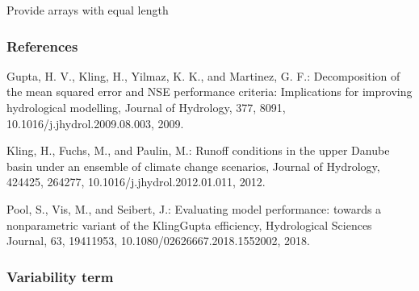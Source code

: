 \documentclass[letterpaper,10pt,english]{sphinxmanual}
\begin{document}
\begin{fulllineitems}
Provide arrays with equal length

\begin{sphinxVerbatim}[commandchars=\\\{\}]
   
   
  \PYG{p}{[}     \PYG{p}{]}
  \PYG{p}{[}     \PYG{p}{]}
 
\end{sphinxVerbatim}
\subsubsection*{References}

Gupta, H. V., Kling, H., Yilmaz, K. K., and Martinez, G. F.: Decomposition
of the mean squared error and NSE performance criteria: Implications for
improving hydrological modelling, Journal of Hydrology, 377, 80\sphinxhyphen{}91,
10.1016/j.jhydrol.2009.08.003, 2009.

Kling, H., Fuchs, M., and Paulin, M.: Runoff conditions in the upper
Danube basin under an ensemble of climate change scenarios, Journal of
Hydrology, 424\sphinxhyphen{}425, 264\sphinxhyphen{}277, 10.1016/j.jhydrol.2012.01.011, 2012.

Pool, S., Vis, M., and Seibert, J.: Evaluating model performance: towards a
non\sphinxhyphen{}parametric variant of the Kling\sphinxhyphen{}Gupta efficiency, Hydrological Sciences
Journal, 63, 1941\sphinxhyphen{}1953, 10.1080/02626667.2018.1552002, 2018.

\end{fulllineitems}



\subsubsection{Variability term}
\label{\detokenize{reference/kge:variability-term}}
\end{document}
